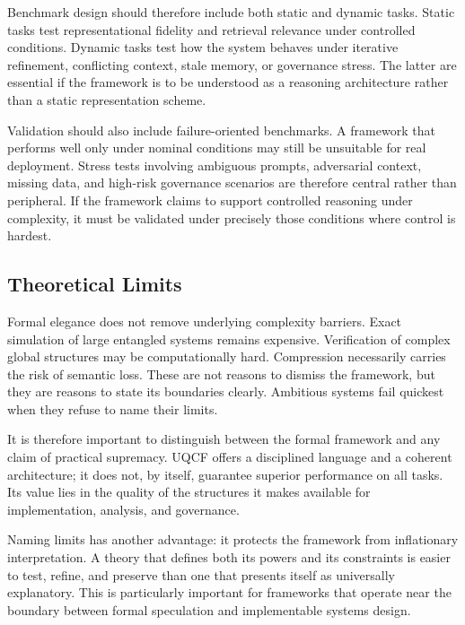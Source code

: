 \documentclass[12pt]{article}
\begin{document}
Benchmark design should therefore include both static and dynamic tasks. Static tasks test representational fidelity and retrieval relevance under controlled conditions. Dynamic tasks test how the system behaves under iterative refinement, conflicting context, stale memory, or governance stress. The latter are essential if the framework is to be understood as a reasoning architecture rather than a static representation scheme.

Validation should also include failure-oriented benchmarks. A framework that performs well only under nominal conditions may still be unsuitable for real deployment. Stress tests involving ambiguous prompts, adversarial context, missing data, and high-risk governance scenarios are therefore central rather than peripheral. If the framework claims to support controlled reasoning under complexity, it must be validated under precisely those conditions where control is hardest.

\subsection{Theoretical Limits}
Formal elegance does not remove underlying complexity barriers. Exact simulation of large entangled systems remains expensive. Verification of complex global structures may be computationally hard. Compression necessarily carries the risk of semantic loss. These are not reasons to dismiss the framework, but they are reasons to state its boundaries clearly. Ambitious systems fail quickest when they refuse to name their limits.

It is therefore important to distinguish between the formal framework and any claim of practical supremacy. UQCF offers a disciplined language and a coherent architecture; it does not, by itself, guarantee superior performance on all tasks. Its value lies in the quality of the structures it makes available for implementation, analysis, and governance.

Naming limits has another advantage: it protects the framework from inflationary interpretation. A theory that defines both its powers and its constraints is easier to test, refine, and preserve than one that presents itself as universally explanatory. This is particularly important for frameworks that operate near the boundary between formal speculation and implementable systems design.
\end{document}

